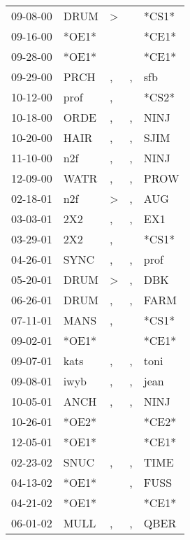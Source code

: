 \begin{supertabular}{lllll}
 09-08-00 &   DRUM &  \textgreater &               &  *CS1* \\
 09-16-00 &  *OE1* &               &               &  *CE1* \\
 09-28-00 &  *OE1* &               &               &  *CE1* \\
 09-29-00 &   PRCH &             , &             , &    sfb \\
 10-12-00 &   prof &             , &               &  *CS2* \\
 10-18-00 &   ORDE &             , &             , &   NINJ \\
 10-20-00 &   HAIR &             , &             , &   SJIM \\
 11-10-00 &    n2f &             , &             , &   NINJ \\
 12-09-00 &   WATR &             , &             , &   PROW \\
 02-18-01 &    n2f &  \textgreater &             , &    AUG \\
 03-03-01 &    2X2 &             , &             , &    EX1 \\
 03-29-01 &    2X2 &             , &               &  *CS1* \\
 04-26-01 &   SYNC &             , &             , &   prof \\
 05-20-01 &   DRUM &  \textgreater &             , &    DBK \\
 06-26-01 &   DRUM &             , &             , &   FARM \\
 07-11-01 &   MANS &             , &               &  *CS1* \\
 09-02-01 &  *OE1* &               &               &  *CE1* \\
 09-07-01 &   kats &             , &             , &   toni \\
 09-08-01 &   iwyb &             , &             , &   jean \\
 10-05-01 &   ANCH &             , &             , &   NINJ \\
 10-26-01 &  *OE2* &               &               &  *CE2* \\
 12-05-01 &  *OE1* &               &               &  *CE1* \\
 02-23-02 &   SNUC &             , &             , &   TIME \\
 04-13-02 &  *OE1* &               &             , &   FUSS \\
 04-21-02 &  *OE1* &               &               &  *CE1* \\
 06-01-02 &   MULL &             , &             , &   QBER \\

\end{supertabular}

